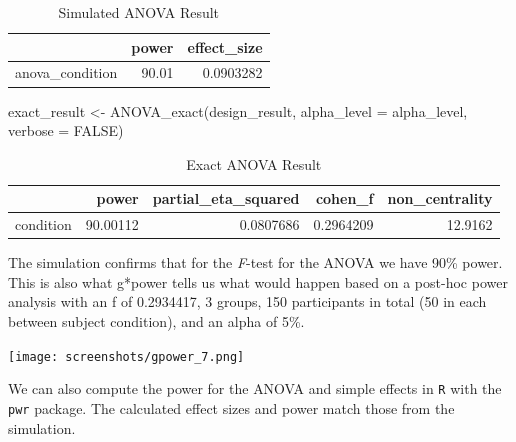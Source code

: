 \documentclass[
]{book}
\newenvironment{Shaded}{\begin{snugshade}}{\end{snugshade}}
\newcommand{\AttributeTok}[1]{\textcolor[rgb]{0.77,0.63,0.00}{#1}}
\newcommand{\ConstantTok}[1]{\textcolor[rgb]{0.00,0.00,0.00}{#1}}
\newcommand{\DecValTok}[1]{\textcolor[rgb]{0.00,0.00,0.81}{#1}}
\newcommand{\FloatTok}[1]{\textcolor[rgb]{0.00,0.00,0.81}{#1}}
\newcommand{\FunctionTok}[1]{\textcolor[rgb]{0.00,0.00,0.00}{#1}}
\newcommand{\NormalTok}[1]{#1}
\newcommand{\OtherTok}[1]{\textcolor[rgb]{0.56,0.35,0.01}{#1}}
\newcommand{\SpecialCharTok}[1]{\textcolor[rgb]{0.00,0.00,0.00}{#1}}
\begin{document}
\begin{table}[!h]

\caption{\label{tab:unnamed-chunk-65}Simulated ANOVA Result}
\centering
\begin{tabular}[t]{l|r|r}
\hline
  & power & effect\_size\\
\hline
anova\_condition & 90.01 & 0.0903282\\
\hline
\end{tabular}
\end{table}

\begin{Shaded}
\begin{Highlighting}[]
\NormalTok{exact\_result }\OtherTok{\textless{}{-}} \FunctionTok{ANOVA\_exact}\NormalTok{(design\_result,}
                            \AttributeTok{alpha\_level =}\NormalTok{ alpha\_level,}
                            \AttributeTok{verbose =} \ConstantTok{FALSE}\NormalTok{)}
\end{Highlighting}
\end{Shaded}

\begin{table}[!h]

\caption{\label{tab:unnamed-chunk-67}Exact ANOVA Result}
\centering
\begin{tabular}[t]{l|r|r|r|r}
\hline
  & power & partial\_eta\_squared & cohen\_f & non\_centrality\\
\hline
condition & 90.00112 & 0.0807686 & 0.2964209 & 12.9162\\
\hline
\end{tabular}
\end{table}

The simulation confirms that for the \emph{F}-test for the ANOVA we have 90\% power. This is also what g*power tells us what would happen based on a post-hoc power analysis with an f of 0.2934417, 3 groups, 150 participants in total (50 in each between subject condition), and an alpha of 5\%.

\texttt{[image: screenshots/gpower\_7.png]}

We can also compute the power for the ANOVA and simple effects in \texttt{R} with the \texttt{pwr} package. The calculated effect sizes and power match those from the simulation.

\begin{Shaded}
\end{Shaded}
\end{document}
